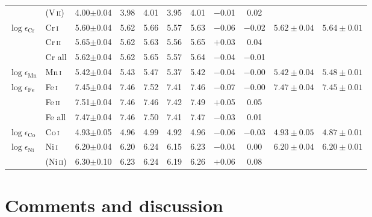 \documentclass[traditabstract]{aa}
\newcommand{\ph}{\phantom{$-$}}
\begin{document}
\begin{table}[tbp]
\begin{tabular}{l l c c c c c c c c c}
                                & (V\,\textsc{ii})  & 4.00$\pm$0.04 & 3.98 & 4.01 & 3.95 & 4.01 & $-$0.01 & \ph0.02 & \vspace{1mm}\\
$\log \epsilon_\mathrm{Cr}$     & Cr\,\textsc{i}    & 5.60$\pm$0.04 & 5.62 & 5.66 & 5.57 & 5.63 & $-$0.06 & $-$0.02 & $5.62\pm0.04$ & $5.64\pm0.01$\\
                                & Cr\,\textsc{ii}   & 5.65$\pm$0.04 & 5.62 & 5.63 & 5.56 & 5.65 & $+$0.03 & \ph0.04 & \\
                                & Cr all            & 5.62$\pm$0.04 & 5.62 & 5.65 & 5.57 & 5.64 & $-$0.04 & $-$0.01 & \vspace{1mm}\\
$\log \epsilon_\mathrm{Mn}$     & Mn\,\textsc{i}    & 5.42$\pm$0.04 & 5.43 & 5.47 & 5.37 & 5.42 & $-$0.04 & $-$0.00 & $5.42\pm0.04$ & $5.48\pm0.01$\vspace{1mm}\\
$\log \epsilon_\mathrm{Fe}$     & Fe\,\textsc{i}    & 7.45$\pm$0.04 & 7.46 & 7.52 & 7.41 & 7.46 & $-$0.07 & $-$0.00 & $7.47\pm0.04$ & $7.45\pm0.01$ \\
                                & Fe\,\textsc{ii}   & 7.51$\pm$0.04 & 7.46 & 7.46 & 7.42 & 7.49 & $+$0.05 & \ph0.05 & \\
                                & Fe all            & 7.47$\pm$0.04 & 7.46 & 7.50 & 7.41 & 7.47 & $-$0.03 & \ph0.01 & \vspace{1mm}\\
$\log \epsilon_\mathrm{Co}$     & Co\,\textsc{i}    & 4.93$\pm$0.05 & 4.96 & 4.99 & 4.92 & 4.96 & $-$0.06 & $-$0.03 & $4.93\pm0.05$ & $4.87\pm0.01$\vspace{1mm}\\
$\log \epsilon_\mathrm{Ni}$     & Ni\,\textsc{i}    & 6.20$\pm$0.04 & 6.20 & 6.24 & 6.15 & 6.23 & $-$0.04 & \ph0.00 & $6.20\pm0.04$ & $6.20\pm0.01$\\
                                & (Ni\,\textsc{ii}) & 6.30$\pm$0.10 & 6.23 & 6.24 & 6.19 & 6.26 & $+$0.06 & \ph0.08 & \vspace{0.5mm}\\
\hline							  
\end{tabular}						  
\end{table}



\section{Comments and discussion}
\label{discussion}
\end{document}
